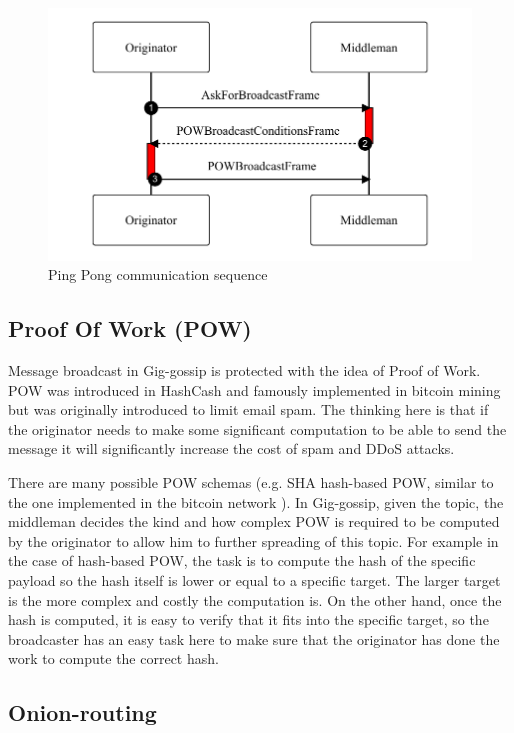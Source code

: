 \documentclass{article}
\begin{document}
\begin{figure}
	\centering
	\includegraphics[scale=0.7]{PingPong.pdf}
	\caption{Ping Pong communication sequence}
	\label{fig:fr:pingpong}
\end{figure}

\subsection{Proof Of Work (POW)}
Message broadcast in Gig-gossip is protected with the idea of Proof of Work. POW was introduced in HashCash \cite{Hashcash} and famously implemented in bitcoin mining but was originally introduced to limit email spam. The thinking here is that if the originator needs to make some significant computation to be able to send the message it will significantly increase the cost of spam and DDoS attacks. 

There are many possible POW schemas (e.g. SHA hash-based POW, similar to the one implemented in the bitcoin network \cite{nakamoto2009bitcoin}). In Gig-gossip, given the topic, the middleman decides the kind and how complex POW is required to be computed by the originator to allow him to further spreading of this topic. For example in the case of hash-based POW, the task is to compute the hash of the specific payload so the hash itself is lower or equal to a specific target. The larger target is the more complex and costly the computation is. On the other hand, once the hash is computed, it is easy to verify that it fits into the specific target, so the broadcaster has an easy task here to make sure that the originator has done the work to compute the correct hash.

\subsection{Onion-routing}
\end{document}
